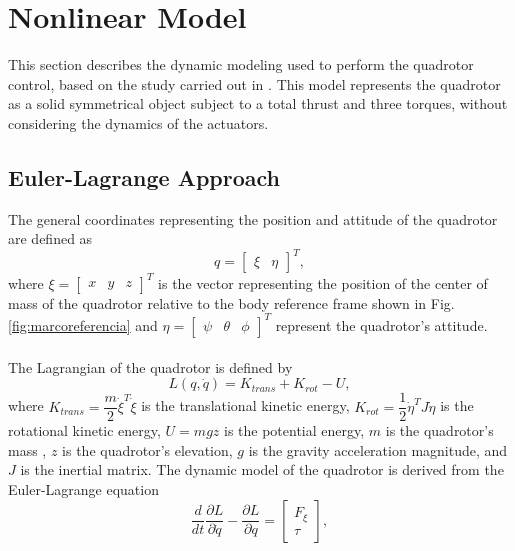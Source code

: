 \section{Nonlinear Model}

This section describes the dynamic modeling used to perform the quadrotor control, based on the study carried out in \cite{modelamiento, modelamientoPDAFC, modelamientoNCQ}. This model represents the quadrotor as a solid symmetrical object subject to a total thrust and three torques, without considering the dynamics of the actuators.


\subsection{Euler-Lagrange Approach}
The general coordinates representing the position and attitude of the quadrotor are defined as
\begin{equation}
	q=\begin{bmatrix}
	\xi & \eta
	\end{bmatrix}^{T},
	\label{ec:coorgenerales}
\end{equation}
where $\xi=\begin{bmatrix}
x & y & z
\end{bmatrix}^{T}$ is the vector representing the position of the center of mass of the quadrotor relative to the body reference frame shown in Fig. \ref{fig:marcoreferencia} and $\eta=\begin{bmatrix}
\psi & \theta & \phi
\end{bmatrix}^{T}$ represent the quadrotor's attitude.
\\\\
The Lagrangian of the quadrotor is defined by
\begin{equation}
	L(q,\dot{q})=K_{trans}+K_{rot} - U,	
	\label{ec:lagrangiano}
\end{equation}
where $ K_{trans} = \dfrac{m}{2}\dot{\xi}^{T}\dot{\xi} $ is the translational kinetic energy, $ K_{rot} = \dfrac{1}{2}\dot{\eta}^{T}J\dot{\eta} $ is the rotational kinetic energy, $ U=mgz $ is the potential energy, $m$ is the quadrotor's mass , $z$ is the quadrotor's elevation, $g$ is the gravity acceleration magnitude, and $J$ is the inertial matrix. The dynamic model of the quadrotor is derived from the Euler-Lagrange equation
\begin{equation}
	\dfrac{d}{dt}\dfrac{\partial L}{\partial \dot{q}}-\dfrac{\partial L}{\partial q}=
	\begin{bmatrix}
	F_{\xi}\\
	\tau
	\end{bmatrix},
	\label{ec:eulerlag}
 \end{equation} 
